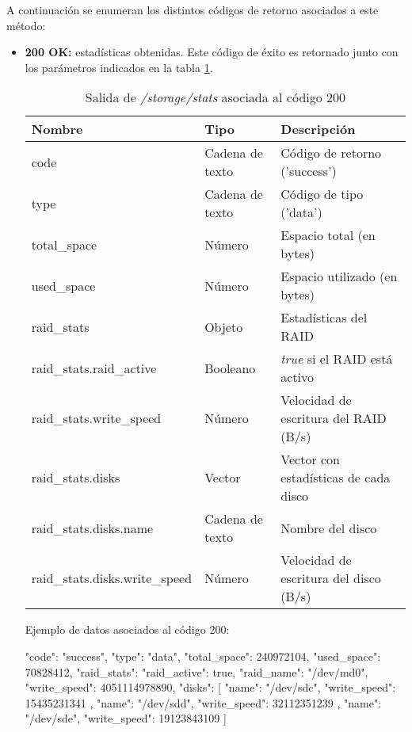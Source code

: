 A continuación se enumeran los distintos códigos de retorno asociados a este método:
\begin{itemize}

\item{\textbf{200 OK:} estadísticas obtenidas. Este código de éxito es retornado junto con los parámetros indicados en la tabla \ref{extra:api:storagestats:ok}.
\begin{table}[H]
\centering
\begin{tabular}{|l|l|l|}
\hline
\rowcolor[HTML]{F5F5F5}
\textbf{Nombre}                & \textbf{Tipo}   & \textbf{Descripción}                        \\ \hline
code                           & Cadena de texto & Código de retorno ('success')               \\ \hline
type                           & Cadena de texto & Código de tipo ('data')                     \\ \hline
total\_space                   & Número          & Espacio total (en bytes)                    \\ \hline
used\_space                    & Número          & Espacio utilizado (en bytes)                \\ \hline
raid\_stats                    & Objeto          & Estadísticas del \gls{RAID}                 \\ \hline
raid\_stats.raid\_active       & Booleano        & \textit{true} si el \gls{RAID} está activo  \\ \hline
raid\_stats.write\_speed       & Número          & Velocidad de escritura del \gls{RAID} (B/s) \\ \hline
raid\_stats.disks              & Vector          & Vector con estadísticas de cada disco       \\ \hline
raid\_stats.disks.name         & Cadena de texto & Nombre del disco                            \\ \hline
raid\_stats.disks.write\_speed & Número          & Velocidad de escritura del disco (B/s)      \\ \hline
\end{tabular}
\caption{Salida de \textit{/storage/stats} asociada al código 200}
\label{extra:api:storagestats:ok}
\end{table}
\begin{minipage}{\textwidth}
Ejemplo de datos asociados al código 200:

\begin{code}[language=json]
{
  "code": "success",
  "type": "data",
  "total_space": 240972104,
  "used_space": 70828412,
  "raid_stats": {
    "raid_active": true,
    "raid_name": "/dev/md0",
    "write_speed": 4051114978890,
    "disks": [
      {
        "name": "/dev/sdc",
        "write_speed": 15435231341
      },
      {
        "name": "/dev/sdd",
        "write_speed": 32112351239
      },
      {
        "name": "/dev/sde",
        "write_speed": 19123843109
      }
    ]
  }
}
\end{code}
\end{minipage}
}

\end{itemize}

